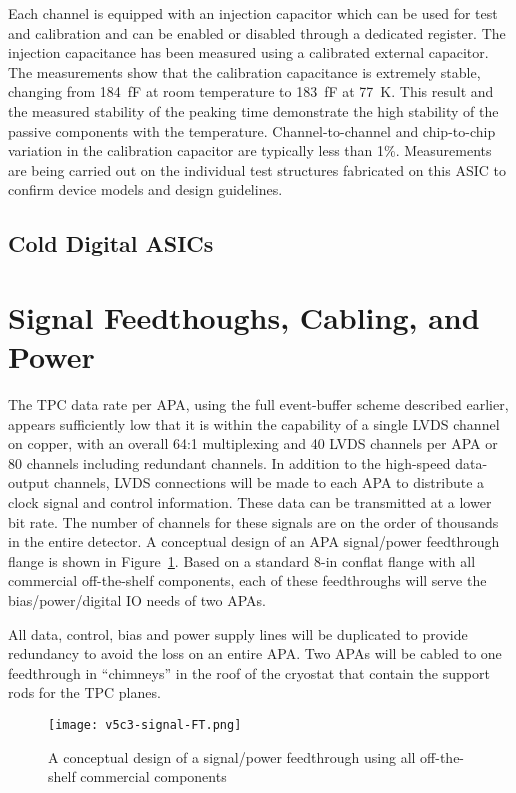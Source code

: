 Each channel is equipped with an injection capacitor which can be used
for test and calibration and can be enabled or disabled through a
dedicated register. The injection capacitance has been measured using 
a calibrated external capacitor. The measurements show
that the calibration capacitance is extremely stable, changing from
184~fF at room temperature to 183~fF at 77~K. This result and the measured
stability of the peaking time demonstrate the high stability of the
passive components with the temperature. Channel-to-channel and chip-to-chip
variation in the calibration capacitor are typically less than 1\%. Measurements are being carried
out on the individual test structures fabricated on this ASIC to
confirm device models and design guidelines.

%
\subsection{Cold Digital ASICs}
\label{subsec:fe-CMOS-digital}

%
\section{Signal Feedthoughs, Cabling, and Power}
\label{sec:ce-feedthrough}

The TPC data rate per APA, using the full event-buffer scheme described earlier,
appears sufficiently low that it is within the capability of a single LVDS channel on copper, with an overall 64:1
multiplexing and 40 LVDS channels per APA or 80 channels including redundant channels.
In addition to the high-speed data-output channels,
LVDS connections will be made to each APA to distribute a clock signal and control information.
These data can be transmitted at a lower bit rate.
The number of channels for these signals are on the order of thousands in the entire detector.
A conceptual design of an APA signal/power feedthrough flange is shown in Figure~\ref{fig:ce-feedthrough}.
Based on a standard 8-in conflat flange with all commercial off-the-shelf components,
each of these feedthroughs will serve the bias/power/digital IO needs of two APAs.  

All data, control, bias and power supply lines will be duplicated to
provide redundancy to avoid the loss on an entire APA.
Two APAs will be cabled to one feedthrough in ``chimneys'' in the roof of the cryostat that
contain the support rods for the TPC planes.

\begin{figure}[htbp]
\centering
\texttt{[image: v5c3-signal-FT.png]}
\caption[Conceptual design of signal/power feedthrough]{A conceptual design of a signal/power feedthrough using all off-the-shelf commercial components}
\label{fig:ce-feedthrough}
\end{figure}

